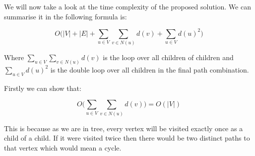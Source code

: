 





We will now take a look at the time complexity of the proposed solution. We can summarise it in the following formula is:

$$ O\bigg( |V| + |E| + \sum_{u \in V}{\sum_{v \in N(u)}{d(v)}} + \sum_{u \in V}{d(u)^2}  \bigg) $$

Where $\sum_{u \in V}{\sum_{v \in N(u)}{d(v)}}$ is the loop over all children of children and $\sum_{u \in V}{d(u)^2}$ is the double loop over all children in the final path combination.

Firstly we can show that:

$$ O\bigg( \sum_{u \in V}{\sum_{v \in N(u)}{d(v)}} \bigg) = O(|V|) $$

This is because as we are in tree, every vertex will be visited exactly once as a child of a child. If it were visited twice then there would be two distinct paths to that vertex which would mean a cycle. 

